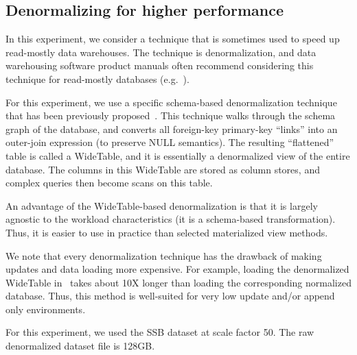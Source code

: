 \subsection{Denormalizing for higher performance}
\label{denormalizing}
In this experiment, we consider a technique that is sometimes used to speed up read-mostly data warehouses. The technique is denormalization, and data warehousing software product manuals often recommend considering this technique for read-mostly databases (e.g.~\cite{denorm-SQL, denorm-IBM, denorm-sybase}).

For this experiment, we use a specific schema-based denormalization technique that has been previously proposed~\cite{widetable}. This technique walks through the schema graph of the database, and converts all foreign-key primary-key ``links'' into an outer-join expression (to preserve NULL semantics). The resulting ``flattened'' table is called a WideTable, and it is essentially a denormalized view of the entire database. The columns in this WideTable are stored as column stores, and complex queries then become scans on this table.


An advantage of the WideTable-based denormalization is that it is largely agnostic to the workload characteristics (it is a schema-based transformation). Thus, it is easier to use in practice than selected materialized view methods.

We note that every denormalization technique has the drawback of making updates and data loading more expensive. For example, loading the denormalized WideTable in \Quickstep\ takes about 10X longer than loading the corresponding normalized database. Thus, this method is well-suited for very low update and/or append only environments.

For this experiment, we used the SSB dataset at scale factor 50. The raw denormalized dataset file is 128GB.


